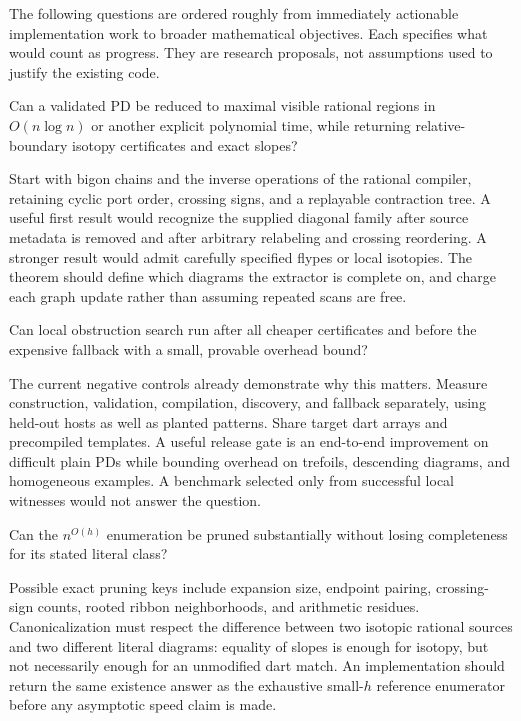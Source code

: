 The following questions are ordered roughly from immediately actionable
implementation work to broader mathematical objectives. Each specifies
what would count as progress. They are research proposals, not assumptions
used to justify the existing code.

\begin{researchquestion}
Can a validated PD be reduced to maximal visible rational regions in
\(O(n\log n)\) or another explicit polynomial time, while returning
relative-boundary isotopy certificates and exact slopes?
\end{researchquestion}
Start with bigon chains and the inverse operations of the rational compiler,
retaining cyclic port order, crossing signs, and a replayable contraction
tree. A useful first result would recognize the supplied diagonal family
after source metadata is removed and after arbitrary relabeling and
crossing reordering. A stronger result would admit carefully specified
flypes or local isotopies. The theorem should define which diagrams
the extractor is complete on, and charge each graph update rather than
assuming repeated scans are free.

\begin{researchquestion}
Can local obstruction search run after all cheaper certificates and before
the expensive fallback with a small, provable overhead bound?
\end{researchquestion}
The current negative controls already demonstrate why this matters.
Measure construction, validation, compilation, discovery, and fallback
separately, using held-out hosts as well as planted patterns. Share target
dart arrays and precompiled templates. A useful release gate is an
end-to-end improvement on difficult plain PDs while bounding overhead on
trefoils, descending diagrams, and homogeneous examples. A benchmark
selected only from successful local witnesses would not answer the question.

\begin{researchquestion}
Can the \(n^{O(h)}\) enumeration be pruned substantially without losing
completeness for its stated literal class?
\end{researchquestion}
Possible exact pruning keys include expansion size, endpoint pairing,
crossing-sign counts, rooted ribbon neighborhoods, and arithmetic residues.
Canonicalization must respect the difference between two isotopic rational
sources and two different literal diagrams: equality of slopes is enough
for isotopy, but not necessarily enough for an unmodified dart match.
An implementation should return the same existence answer as the exhaustive
small-\(h\) reference enumerator before any asymptotic speed claim is made.

